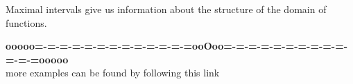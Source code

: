 \documentclass{ximera}
\begin{document}
Maximal intervals give us information about the structure of the domain of functions.

















\begin{center}
\textbf{\textcolor{green!50!black}{ooooo=-=-=-=-=-=-=-=-=-=-=-=-=ooOoo=-=-=-=-=-=-=-=-=-=-=-=-=ooooo}} \\

more examples can be found by following this link\\ 

\end{center}
\end{document}
